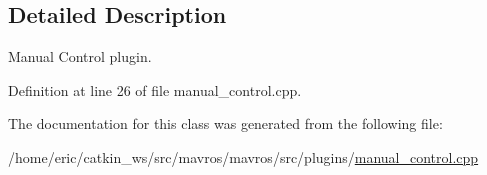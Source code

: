 \subsection{Detailed Description}
Manual Control plugin. 

Definition at line 26 of file manual\+\_\+control.\+cpp.



The documentation for this class was generated from the following file\+:\begin{DoxyCompactItemize}
\item 
/home/eric/catkin\+\_\+ws/src/mavros/mavros/src/plugins/\mbox{\hyperlink{manual__control_8cpp}{manual\+\_\+control.\+cpp}}\end{DoxyCompactItemize}
